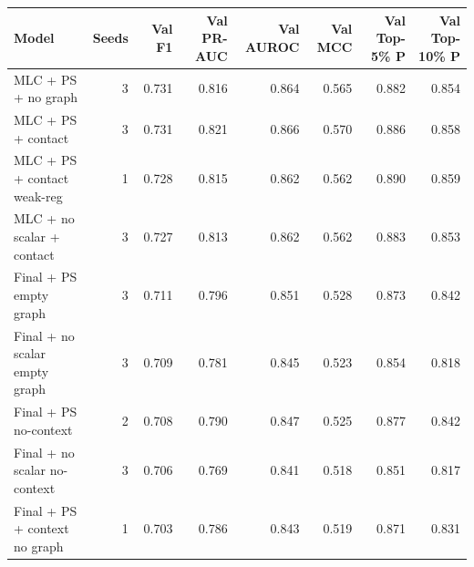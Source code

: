 \begin{tabular}{lrrrrrrr}
\toprule
Model & Seeds & Val F1 & Val PR-AUC & Val AUROC & Val MCC & Val Top-5\% P & Val Top-10\% P \\
\midrule
MLC + PS + no graph & 3 & 0.731 & 0.816 & 0.864 & 0.565 & 0.882 & 0.854 \\
MLC + PS + contact & 3 & 0.731 & 0.821 & 0.866 & 0.570 & 0.886 & 0.858 \\
MLC + PS + contact weak-reg & 1 & 0.728 & 0.815 & 0.862 & 0.562 & 0.890 & 0.859 \\
MLC + no scalar + contact & 3 & 0.727 & 0.813 & 0.862 & 0.562 & 0.883 & 0.853 \\
Final + PS empty graph & 3 & 0.711 & 0.796 & 0.851 & 0.528 & 0.873 & 0.842 \\
Final + no scalar empty graph & 3 & 0.709 & 0.781 & 0.845 & 0.523 & 0.854 & 0.818 \\
Final + PS no-context & 2 & 0.708 & 0.790 & 0.847 & 0.525 & 0.877 & 0.842 \\
Final + no scalar no-context & 3 & 0.706 & 0.769 & 0.841 & 0.518 & 0.851 & 0.817 \\
Final + PS + context no graph & 1 & 0.703 & 0.786 & 0.843 & 0.519 & 0.871 & 0.831 \\
\bottomrule
\end{tabular}
